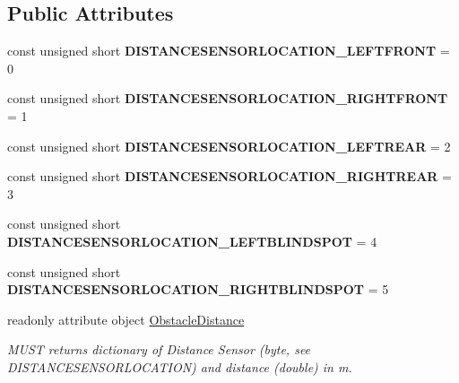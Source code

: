 \subsection*{Public Attributes}
\begin{DoxyCompactItemize}
\item 
\hypertarget{interfaceVehicle_1_1ObstacleDistance_a58c979475d76fc50098b853deddf54bd}{const unsigned short {\bfseries D\-I\-S\-T\-A\-N\-C\-E\-S\-E\-N\-S\-O\-R\-L\-O\-C\-A\-T\-I\-O\-N\-\_\-\-L\-E\-F\-T\-F\-R\-O\-N\-T} = 0}\label{interfaceVehicle_1_1ObstacleDistance_a58c979475d76fc50098b853deddf54bd}

\item 
\hypertarget{interfaceVehicle_1_1ObstacleDistance_a9414d185b2b434ce95395368ea087509}{const unsigned short {\bfseries D\-I\-S\-T\-A\-N\-C\-E\-S\-E\-N\-S\-O\-R\-L\-O\-C\-A\-T\-I\-O\-N\-\_\-\-R\-I\-G\-H\-T\-F\-R\-O\-N\-T} = 1}\label{interfaceVehicle_1_1ObstacleDistance_a9414d185b2b434ce95395368ea087509}

\item 
\hypertarget{interfaceVehicle_1_1ObstacleDistance_a3cb084f90145734947d8e595cfc07c1c}{const unsigned short {\bfseries D\-I\-S\-T\-A\-N\-C\-E\-S\-E\-N\-S\-O\-R\-L\-O\-C\-A\-T\-I\-O\-N\-\_\-\-L\-E\-F\-T\-R\-E\-A\-R} = 2}\label{interfaceVehicle_1_1ObstacleDistance_a3cb084f90145734947d8e595cfc07c1c}

\item 
\hypertarget{interfaceVehicle_1_1ObstacleDistance_aae2cbbb3f86eec19bc1b63458443e47d}{const unsigned short {\bfseries D\-I\-S\-T\-A\-N\-C\-E\-S\-E\-N\-S\-O\-R\-L\-O\-C\-A\-T\-I\-O\-N\-\_\-\-R\-I\-G\-H\-T\-R\-E\-A\-R} = 3}\label{interfaceVehicle_1_1ObstacleDistance_aae2cbbb3f86eec19bc1b63458443e47d}

\item 
\hypertarget{interfaceVehicle_1_1ObstacleDistance_a6794606f96abf72a687e5484ef5c48c7}{const unsigned short {\bfseries D\-I\-S\-T\-A\-N\-C\-E\-S\-E\-N\-S\-O\-R\-L\-O\-C\-A\-T\-I\-O\-N\-\_\-\-L\-E\-F\-T\-B\-L\-I\-N\-D\-S\-P\-O\-T} = 4}\label{interfaceVehicle_1_1ObstacleDistance_a6794606f96abf72a687e5484ef5c48c7}

\item 
\hypertarget{interfaceVehicle_1_1ObstacleDistance_acd275a299cf7a4fb39e80f0ef45eb08f}{const unsigned short {\bfseries D\-I\-S\-T\-A\-N\-C\-E\-S\-E\-N\-S\-O\-R\-L\-O\-C\-A\-T\-I\-O\-N\-\_\-\-R\-I\-G\-H\-T\-B\-L\-I\-N\-D\-S\-P\-O\-T} = 5}\label{interfaceVehicle_1_1ObstacleDistance_acd275a299cf7a4fb39e80f0ef45eb08f}

\item 
readonly attribute object \hyperlink{interfaceVehicle_1_1ObstacleDistance_ac522de7d7254e19603edc217908b8a6b}{Obstacle\-Distance}
\begin{DoxyCompactList}\small\item\em M\-U\-S\-T returns dictionary of Distance Sensor (byte, see D\-I\-S\-T\-A\-N\-C\-E\-S\-E\-N\-S\-O\-R\-L\-O\-C\-A\-T\-I\-O\-N) and distance (double) in m. \end{DoxyCompactList}\end{DoxyCompactItemize}
